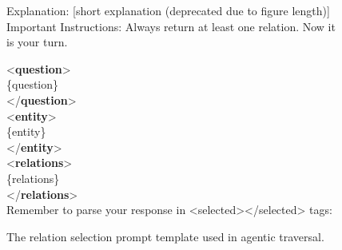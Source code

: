 \begin{figure}
\begin{minipage}{1\columnwidth}
\begin{tcolorbox}[title=Relation Selection Prompt]
    Explanation: [short explanation (deprecated due to figure length)] \\

    Important Instructions: Always return at least one relation.
    Now it is your turn. 

    \vspace{5pt}
    <\textbf{question}> \\
    \{question\} \\
    </\textbf{question}> \\

    <\textbf{entity}> \\
    \{entity\}  \\
    </\textbf{entity}> \\
 
    <\textbf{relations}> \\
    \{relations\} \\
    </\textbf{relations}> \\

    Remember to parse your response in <selected></selected> tags:
    \end{tcolorbox}

\caption{The relation selection prompt template used in agentic traversal. }
\label{fig:agent-relation-prompt}
\end{minipage}
\end{figure}
